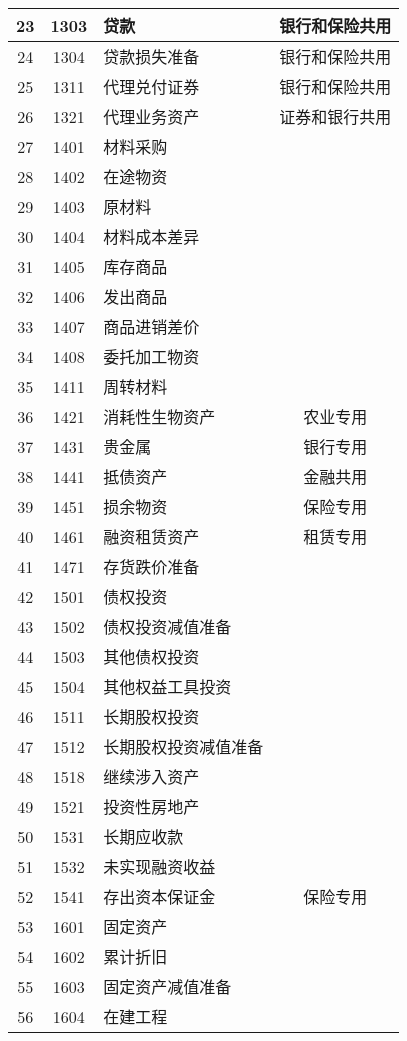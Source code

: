 \documentclass[a4paper]{ctexart}    %
\begin{document}
\begin{center}
\begin{longtable}{|c|c|p{6cm}|c|}
23 & 1303 & 贷款 & 银行和保险共用 \\\hline
24 & 1304 & 贷款损失准备 & 银行和保险共用 \\\hline
25 & 1311 & 代理兑付证券 & 银行和保险共用 \\\hline
26 & 1321 & 代理业务资产 & 证券和银行共用 \\\hline
27 & 1401 & 材料采购 & \\\hline
28 & 1402 & 在途物资 & \\\hline
29 & 1403 & 原材料 & \\\hline
30 & 1404 & 材料成本差异 & \\\hline
31 & 1405 & 库存商品 & \\\hline
32 & 1406 & 发出商品 & \\\hline
33 & 1407 & 商品进销差价 & \\\hline
34 & 1408 & 委托加工物资 & \\\hline
35 & 1411 & 周转材料 & \\\hline
36 & 1421 & 消耗性生物资产 & 农业专用 \\\hline
37 & 1431 & 贵金属 & 银行专用 \\\hline
38 & 1441 & 抵债资产 & 金融共用 \\\hline
39 & 1451 & 损余物资 & 保险专用 \\\hline
40 & 1461 & 融资租赁资产 & 租赁专用 \\\hline
41 & 1471 & 存货跌价准备 & \\\hline
42 & 1501 & 债权投资 & \\\hline
43 & 1502 & 债权投资减值准备 & \\\hline
44 & 1503 & 其他债权投资 & \\\hline
45 & 1504 & 其他权益工具投资 & \\\hline
46 & 1511 & 长期股权投资 & \\\hline
47 & 1512 & 长期股权投资减值准备 & \\\hline
48 & 1518 & 继续涉入资产 & \\\hline
49 & 1521 & 投资性房地产 & \\\hline
50 & 1531 & 长期应收款 & \\\hline
51 & 1532 & 未实现融资收益 & \\\hline
52 & 1541 & 存出资本保证金 & 保险专用 \\\hline
53 & 1601 & 固定资产 & \\\hline
54 & 1602 & 累计折旧 & \\\hline
55 & 1603 & 固定资产减值准备 & \\\hline
56 & 1604 & 在建工程 & \\\hline

\end{longtable}
\end{center}
\end{document}
